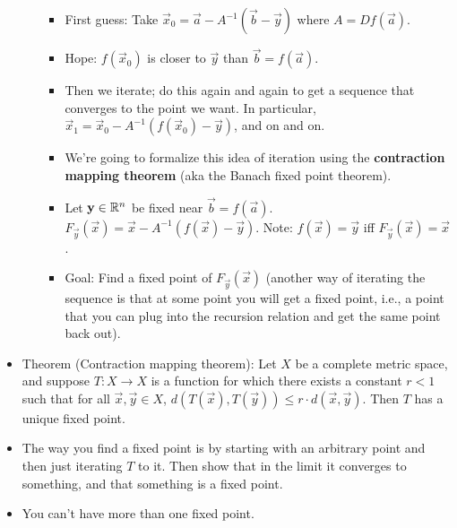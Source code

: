 \documentclass[../notes.tex]{subfiles}
\begin{document}
\begin{itemize}
\begin{itemize}
        \begin{itemize}
            \item First guess: Take $\vec{x}_0=\vec{a}-A^{-1}(\vec{b}-\vec{y})$ where $A=Df(\vec{a})$.
            \item Hope: $f(\vec{x}_0)$ is closer to $\vec{y}$ than $\vec{b}=f(\vec{a})$.
            \item Then we iterate; do this again and again to get a sequence that converges to the point we want. In particular, $\vec{x}_1=\vec{x}_0-A^{-1}(f(\vec{x}_0)-\vec{y})$, and on and on.
            \item We're going to formalize this idea of iteration using the \textbf{contraction mapping theorem} (aka the Banach fixed point theorem).
            \item Let $\mathbf{y}\in\mathbb{R}^n$ be fixed near $\vec{b}=f(\vec{a})$. $F_\vec{y}(\vec{x})=\vec{x}-A^{-1}(f(\vec{x})-\vec{y})$. Note: $f(\vec{x})=\vec{y}$ iff $F_\vec{y}(\vec{x})=\vec{x}$.
            \item Goal: Find a fixed point of $F_\vec{y}(\vec{x})$ (another way of iterating the sequence is that at some point you will get a fixed point, i.e., a point that you can plug into the recursion relation and get the same point back out).
        \end{itemize}
    \end{itemize}
    \item Theorem (Contraction mapping theorem): Let $X$ be a complete metric space, and suppose $T:X\to X$ is a function for which there exists a constant $r<1$ such that for all $\vec{x},\vec{y}\in X$, $d(T(\vec{x}),T(\vec{y}))\leq r\cdot d(\vec{x},\vec{y})$. Then $T$ has a unique fixed point.
    \item The way you find a fixed point is by starting with an arbitrary point and then just iterating $T$ to it. Then show that in the limit it converges to something, and that something is a fixed point.
    \item You can't have more than one fixed point.
\end{itemize}
\end{document}
